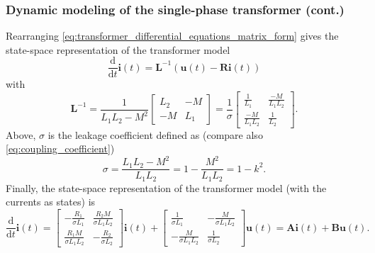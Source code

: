 \begin{frame}
	\frametitle{Dynamic modeling of the single-phase transformer (cont.)}
		Rearranging \eqref{eq:transformer_differential_equations_matrix_form} gives the state-space representation of the transformer model
		\begin{equation}
			\frac{\mathrm{d}}{\mathrm{d}t}\bm{i}(t) = \bm{L}^{-1}\left(\bm{u}(t)-\bm{R}\bm{i}(t) \right)
			\label{eq:transformer_state_space_01}
		\end{equation}
		with
		$$ \renewcommand*{\arraystretch}{1.3} \bm{L}^{-1} = \frac{1}{L_1L_2 - M^2} \begin{bmatrix} L_2 & -M \\ -M & L_1 \end{bmatrix} = \frac{1}{\sigma} \begin{bmatrix} \frac{1}{L_1} &  \frac{-M}{L_1 L_2} \\ \frac{-M}{L_1 L_2} & \frac{1}{L_2} \end{bmatrix}.$$
		\pause
		Above, $\sigma$ is the leakage coefficient defined as (compare also \eqref{eq:coupling_coefficient})
		\begin{equation}
			\sigma = \frac{L_1 L_2 -M^2}{L_1 L_2 } = 1 - \frac{M^2}{ L_1 L_2} = 1 - k^2 .
			\label{eq:leakage_coefficient}
		\end{equation}
		\pause
		Finally, the state-space representation of the transformer model (with the currents as states) is
		\begin{equation}
			\renewcommand*{\arraystretch}{1.3} 
			\frac{\mathrm{d}}{\mathrm{d}t}\bm{i}(t) = \begin{bmatrix} -\frac{R_1}{\sigma L_1} & \frac{R_2 M}{\sigma L_1 L_2} \\ \frac{R_1 M}{\sigma L_1 L_2} & -\frac{R_2}{\sigma L_2} \end{bmatrix} \bm{i}(t) + \begin{bmatrix} \frac{1}{\sigma L_1} & -\frac{M}{\sigma L_1 L_2} \\ -\frac{M}{\sigma L_1 L_2} & \frac{1}{\sigma L_2} \end{bmatrix} \bm{u}(t) = \bm{A} \bm{i}(t) + \bm{B} \bm{u}(t) .	 
			\label{eq:transformer_state_space_02}
		\end{equation}
\end{frame}

